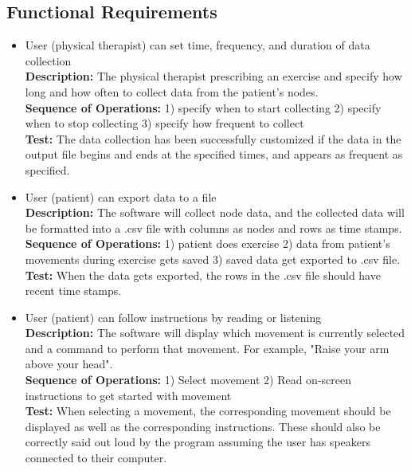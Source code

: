 \documentclass[onecolumn, draftclsnofoot,10pt, compsoc]{IEEEtran}
\begin{document}
\subsection{Functional Requirements}
\begin{itemize}
\item   User (physical therapist) can set time, frequency, and duration of data collection\\
\textbf{Description:} The physical therapist prescribing an exercise and specify how long and how often to collect data from the patient's nodes.\\
\textbf{Sequence of Operations:} 1) specify when to start collecting 2) specify when to stop collecting 3) specify how frequent to collect\\
\textbf{Test:} The data collection has been successfully customized if the data in the output file begins and ends at the specified times, and appears as frequent as specified.\\

\item   User (patient) can export data to a file\\
\textbf{Description:} The software will collect node data, and the collected data will be formatted into a .csv file with columns as nodes and rows as time stamps.\\
\textbf{Sequence of Operations:} 1) patient does exercise 2) data from patient's movements during exercise gets saved 3) saved data get exported to .csv file.\\
\textbf{Test:} When the data gets exported, the rows in the .csv file should have recent time stamps.\\

\item   User (patient) can follow instructions by reading or listening\\
\textbf{Description:} The software will display which movement is currently selected and a command to perform that movement. For example, "Raise your arm above your head".\\ 
\textbf{Sequence of Operations:} 1) Select movement 2) Read on-screen instructions to get started with movement\\
\textbf{Test:} When selecting a movement, the corresponding movement should be displayed as well as the corresponding instructions. These should also be correctly said out loud by the program assuming the user has speakers connected to their computer. \\


\end{itemize}
\end{document}
